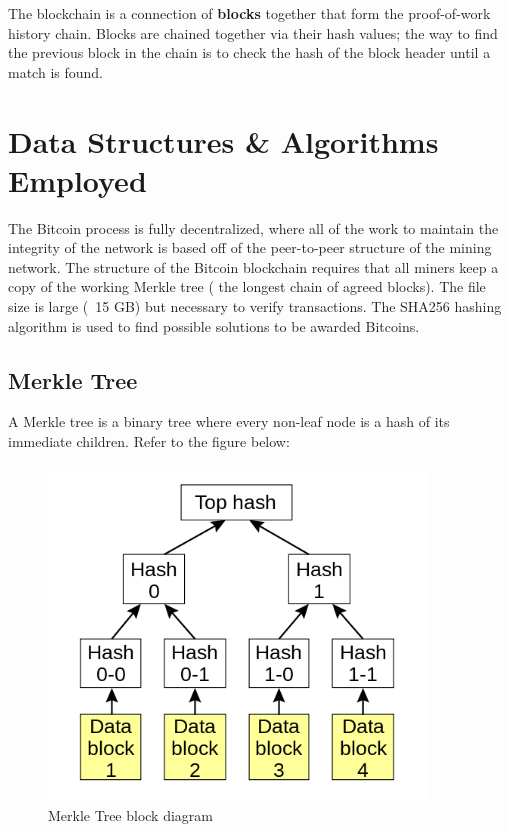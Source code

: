 \documentclass[pdftex,11pt]{article}
\begin{document}
The blockchain is a connection of {\bf blocks} together that form the proof-of-work history chain. Blocks are chained together via their hash values; the way to find the previous block in the chain is to check the hash of the block header until a match is found.

\section{Data Structures \& Algorithms Employed }
The Bitcoin process is fully decentralized, where all of the work to maintain the integrity of the network is based off of the peer-to-peer structure of the mining network. The structure of the Bitcoin blockchain requires that all miners keep a copy of the working Merkle tree ( the longest chain of agreed blocks). The file size is large (~15 GB) but necessary to verify transactions. The SHA256 hashing algorithm is used to find possible solutions to be awarded Bitcoins.

\subsection{Merkle Tree}
A Merkle tree is a binary tree where every non-leaf node is a hash of its immediate children. Refer to the figure below:
\begin{figure}[H]
	\centering
	\includegraphics[width=100mm]{figures/merkletree.png}
	\caption{Merkle Tree block diagram}
	\label{merkletree}
\end{figure}
\end{document}
